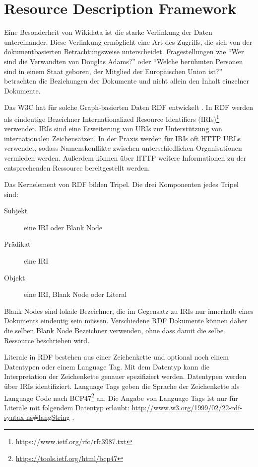\section{Resource Description Framework}
Eine Besonderheit von Wikidata ist die starke Verlinkung der Daten untereinander.
Diese Verlinkung ermöglicht eine Art des Zugriffs, die sich von der dokumentbasierten Betrachtungsweise unterscheidet.
Fragestellungen wie "`Wer sind die Verwandten von Douglas Adams?"' oder "`Welche berühmten Personen sind in einem Staat geboren, der Mitglied der Europäischen Union ist?"' betrachten die Beziehungen der Dokumente und nicht allein den Inhalt einzelner Dokumente.

Das W3C hat für solche Graph-basierten Daten RDF entwickelt \cite{rdf-spec}.
In RDF werden als eindeutige Bezeichner Internationalized Resource Identifiers (IRIs)\footnote{https://www.ietf.org/rfc/rfc3987.txt} verwendet.
IRIs sind eine Erweiterung von URIs zur Unterstützung von internationalen Zeichensätzen.
In der Praxis werden für IRIs oft HTTP URLs verwendet, sodass Namenskonflikte zwischen unterschiedlichen Organisationen vermieden werden.
Außerdem können über HTTP weitere Informationen zu der entsprechenden Ressource bereitgestellt werden.

Das Kernelement von RDF bilden Tripel. Die drei Komponenten jedes Tripel sind:
\begin{description}
\item[Subjekt] eine IRI oder Blank Node
\item[Prädikat] eine IRI
\item[Objekt] eine IRI, Blank Node oder Literal
\end{description}
Blank Nodes sind lokale Bezeichner, die im Gegensatz zu IRIs nur innerhalb eines Dokuments eindeutig sein müssen.
Verschiedene RDF Dokumente können daher die selben Blank Node Bezeichner verwenden, ohne dass damit die selbe Ressource beschrieben wird.

Literale in RDF bestehen aus einer Zeichenkette und optional noch einem Datentypen oder einem Language Tag.
Mit dem Datentyp kann die Interpretation der Zeichenkette genauer spezifiziert werden.
Datentypen werden über IRIs identifiziert.
Language Tags geben die Sprache der Zeichenkette als Language Code nach BCP47\footnote{\url{https://tools.ietf.org/html/bcp47}} an.
Die Angabe von Language Tags ist nur für Literale mit folgendem Datentyp erlaubt: \url{http://www.w3.org/1999/02/22-rdf-syntax-ns#langString} \cite{rdf-spec} .


